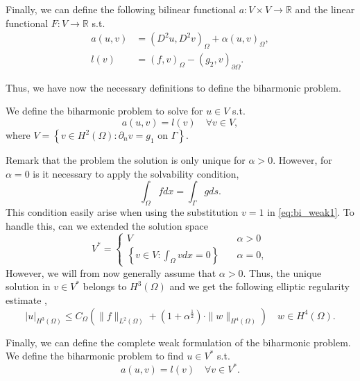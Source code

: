 Finally, we can define the following bilinear functional $a:V\times V \to  \mathbb{R} $ and the linear functional $F: V \to \mathbb{R} $ s.t.
\begin{equation}
\label{eq:weak_formulation}
\begin{split}
a\left( u,v \right) & =    \left( D ^2 u , D ^2 v\right)_{\Omega }  +
\alpha \left( u, v \right)_{\Omega }   , \\
l\left( v \right) & = \left( f,v \right)_{\Omega } - \left(g_{2},v \right)_{\partial \Omega }.
\end{split}
\end{equation}

Thus, we have now the necessary definitions to define the biharmonic problem.

We define the biharmonic problem to solve for $u \in V  $ s.t.
\begin{equation}
    \label{eq:bi_weak1}
a\left( u,v \right) = l(v)\quad \forall v \in
V,
\end{equation}
where $ V = \left\{ v \in H^2\left( \Omega  \right) : \partial _{n} v = g_{1}  \text{ on }
\Gamma   \right\}$.

Remark that the problem the solution is only unique for $\alpha  > 0$. However, for $\alpha  = 0$ is it necessary to apply the solvability condition,
\begin{equation*}
 \int_{\Omega }^{} f dx = \int_{\Gamma  }^{} g ds
.\end{equation*}
This condition easily arise when using the substitution $v=1$ in \eqref{eq:bi_weak1}. To handle this, can we extended the solution space \[
V^{*} = \begin{cases}
    V \quad & \alpha  > 0 \\
    \left\{ v \in V: \int_{\Omega }^{} v dx  = 0\right\} \quad & \alpha  = 0,
\end{cases}
\]
However, we will from now generally assume that $\alpha >0$.
Thus, the unique solution in $v \in V^{*}$ belongs to $H^{3 }(\Omega ) $ and we get the following
elliptic regularity estimate \cite{gu2012c0},
\begin{equation*}
\label{eq:bi_harmonic_ellitpic_regularity}
\left| u \right| _{H^{3 }\left( \Omega  \right) }  \le C_{\Omega } \left( \| f \|_{  L^{2}( \Omega ) }^{  } + ( 1 + \alpha  ^{\frac{1}{2}}
) \cdot \| w  \|_{ H^{4}\left( \Omega  \right)  }^{  }    \right) \quad w\in H^{4}\left( \Omega  \right).
\end{equation*}

Finally, we can define the complete weak formulation of the biharmonic problem.
We define the biharmonic problem to find $u \in V^*  $ s.t.
\begin{equation}
a\left( u,v \right) = l(v)\quad \forall v \in
V^* .
\end{equation}

